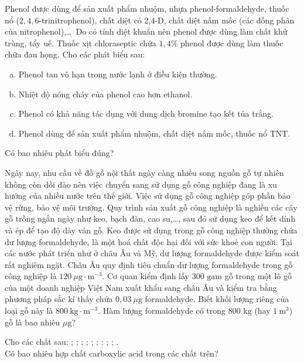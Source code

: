 \documentclass[12pt,a4paper]{article}
\begin{document}
\begin{ex}
Phenol được dùng để sản xuất phẩm nhuộm, nhựa phenol-formaldehyde, thuốc nổ ($2{,}4{,}6$-trinitrophenol), chất diệt cỏ 2,4-D, chất diệt nấm mốc (các đồng phân của nitrophenol),\dots\ Do có tính diệt khuẩn nên phenol được dùng làm chất khử trùng, tẩy uế. Thuốc xịt chloraseptic chứa $1{,}4\%$ phenol được dùng làm thuốc chữa đau họng. Cho các phát biểu sau:
\begin{enumerate}[a)]
	\item Phenol tan vô hạn trong nước lạnh ở điều kiện thường.
	\item Nhiệt độ nóng chảy của phenol cao hơn ethanol.
	\item Phenol có khả năng tác dụng với dung dịch bromine tạo kết tủa trắng.
	\item Phenol dùng để sản xuất phẩm nhuộm, chất diệt nấm mốc, thuốc nổ TNT.
\end{enumerate}
Có bao nhiêu phát biểu đúng?
\par{}
\loigiai{}
\end{ex}

\begin{ex}
Ngày nay, nhu cầu về đồ gỗ nội thất ngày càng nhiều song nguồn gỗ tự nhiên không còn dồi dào nên việc chuyển sang sử dụng gỗ công nghiệp đang là xu hướng của nhiều nước trên thế giới. Việc sử dụng gỗ công nghiệp góp phần bảo vệ rừng, bảo vệ môi trường. Quy trình sản xuất gỗ công nghiệp là nghiền các cây gỗ trồng ngắn ngày như keo, bạch đàn, cao su,\dots, sau đó sử dụng keo để kết dính và ép để tạo độ dày ván gỗ. Keo được sử dụng trong gỗ công nghiệp thường chứa dư lượng formaldehyde, là một hoá chất độc hại đối với sức khoẻ con người. Tại các nước phát triển như ở châu Âu và Mỹ, dư lượng formaldehyde được kiểm soát rất nghiêm ngặt. Châu Âu quy định tiêu chuẩn dư lượng formaldehyde trong gỗ công nghiệp là $120\ \mu\mathrm{g}\cdot\mathrm{m}^{-3}$. Cơ quan kiểm định lấy $300\text{ gam}$ gỗ trong một lô gỗ của một doanh nghiệp Việt Nam xuất khẩu sang châu Âu và kiểm tra bằng phương pháp sắc kí thấy chứa $0{,}03\ \mu\mathrm{g}$ formaldehyde. Biết khối lượng riêng của loại gỗ này là $800\ \mathrm{kg}\cdot\mathrm{m}^{-3}$. Hàm lượng formaldehyde có trong $800\text{ kg}$ (hay $1\ \mathrm{m}^3$) gỗ là bao nhiêu $\mu\mathrm{g}$?
\par{}
\loigiai{}
\end{ex}

\begin{ex}
Cho các chất sau: ; ; ; ; ; ; ; ; ; .\\
Có bao nhiêu hợp chất carboxylic acid trong các chất trên?
\par{}
\loigiai{}
\end{ex}
\end{document}
